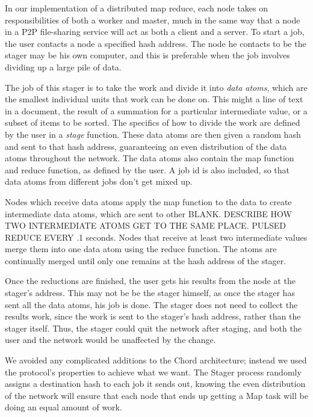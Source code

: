 \documentclass[conference, compsocconf, letterpaper]{IEEEtran}
\begin{document}
In our implementation of a distributed map reduce, each node takes on responsibilities of both a worker and master, much in the same way that a node in a P2P file-sharing service will act as both a client and a server.  To start a job, the user contacts a node a specified hash address. The node he contacts to be the stager may be his own computer, and this is preferable when the job involves dividing up a large pile of data. 

The job of this stager is to take the work and divide it into \emph{data atoms}, which are the smallest individual units that work can be done on.  This might a line of text in a document, the result of a summation for a particular intermediate value, or a subset of items to be sorted.  The specifics of how to divide the work are defined by the user in a \emph{stage} function.  These data atoms are then given a random hash and sent to that hash address, guaranteeing an even distribution of the data atoms throughout the network.  The data atoms also contain the map function and reduce function, as defined by the user.  A job id is also included, so that data atoms from different jobs don't get mixed up.

Nodes which receive data atoms apply the map function to the data to create intermediate data atoms, which are sent to other BLANK.  DESCRIBE HOW TWO INTERMEDIATE ATOMS GET TO THE SAME PLACE. PULSED REDUCE EVERY .1 seconds. Nodes that receive at least two intermediate values merge them into one data atom using the reduce function.   The atoms are continually merged until only one remains at the hash address of the stager. 

Once the reductions are finished, the user gets his results from the node at the stager's address.  This may not be be the stager himself, as once the stager has sent all the data atoms, his job is done.  The stager does not need to collect the results work, since the work is sent to the stager's hash address, rather than the stager itself.  Thus, the stager could quit the network after staging, and both the user and the network would be unaffected by the change.


We avoided any complicated additions to the Chord architecture; instead we used the protocol's properties to achieve what we want.  The Stager process randomly assigns a destination hash to each job it sends out, knowing the even distribution of the network will ensure that each node that ends up getting a Map task will be doing an equal amount of work.  
\end{document}
